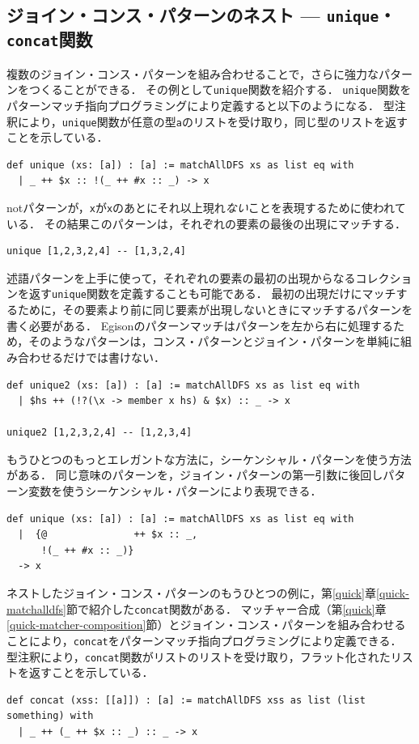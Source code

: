 \subsection{ジョイン・コンス・パターンのネスト --- \texttt{unique}・\texttt{concat}関数}\label{pmo-nested-join-cons}

複数のジョイン・コンス・パターンを組み合わせることで，さらに強力なパターンをつくることができる．
その例として\lstinline{unique}関数を紹介する．
\lstinline{unique}関数をパターンマッチ指向プログラミングにより定義すると以下のようになる．
型注釈により，\lstinline{unique}関数が任意の型\lstinline{a}のリストを受け取り，同じ型のリストを返すことを示している．
\begin{lstlisting}[language=egison,numbers=none]
def unique (xs: [a]) : [a] := matchAllDFS xs as list eq with
  | _ ++ $x :: !(_ ++ #x :: _) -> x
\end{lstlisting}
notパターンが，\lstinline{x}が\lstinline{x}のあとにそれ以上現れ\emph{ない}ことを表現するために使われている．
その結果このパターンは，それぞれの要素の最後の出現にマッチする．
\begin{lstlisting}[language=egison,numbers=none]
unique [1,2,3,2,4] -- [1,3,2,4]
\end{lstlisting}

述語パターンを上手に使って，それぞれの要素の最初の出現からなるコレクションを返す\lstinline{unique}関数を定義することも可能である．
最初の出現だけにマッチするために，その要素より前に同じ要素が出現しないときにマッチするパターンを書く必要がある．
Egisonのパターンマッチはパターンを左から右に処理するため，そのようなパターンは，コンス・パターンとジョイン・パターンを単純に組み合わせるだけでは書けない．
\begin{lstlisting}[language=egison,numbers=none]
def unique2 (xs: [a]) : [a] := matchAllDFS xs as list eq with
  | $hs ++ (!?(\x -> member x hs) & $x) :: _ -> x

unique2 [1,2,3,2,4] -- [1,2,3,4]
\end{lstlisting}

もうひとつのもっとエレガントな方法に，シーケンシャル・パターンを使う方法がある．
同じ意味のパターンを，ジョイン・パターンの第一引数に後回しパターン変数を使うシーケンシャル・パターンにより表現できる．
\begin{lstlisting}[language=egison,numbers=none]
def unique (xs: [a]) : [a] := matchAllDFS xs as list eq with
  |  {@               ++ $x :: _,
      !(_ ++ #x :: _)}
  -> x
\end{lstlisting}

ネストしたジョイン・コンス・パターンのもうひとつの例に，第\ref{quick}章\ref{quick-matchalldfs}節で紹介した\lstinline{concat}関数がある．
マッチャー合成（第\ref{quick}章\ref{quick-matcher-composition}節）とジョイン・コンス・パターンを組み合わせることにより，\lstinline{concat}をパターンマッチ指向プログラミングにより定義できる．
型注釈により，\lstinline{concat}関数がリストのリストを受け取り，フラット化されたリストを返すことを示している．
\begin{lstlisting}[language=egison,numbers=none]
def concat (xss: [[a]]) : [a] := matchAllDFS xss as list (list something) with
  | _ ++ (_ ++ $x :: _) :: _ -> x
\end{lstlisting}


